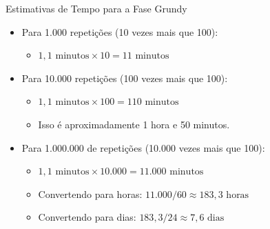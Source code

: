 \begin{frame}{Estimativas de Tempo para a Fase Grundy}
    \begin{itemize}
        \item Para 1.000 repetições (10 vezes mais que 100):
        \begin{itemize}
            \item $1,1 \text{ minutos} \times 10 = 11 \text{ minutos}$
        \end{itemize}
        
        \vspace{0.4cm}
        
        \item Para 10.000 repetições (100 vezes mais que 100):
        \begin{itemize}
            \item $1,1 \text{ minutos} \times 100 = 110 \text{ minutos}$
            \item Isso é aproximadamente 1 hora e 50 minutos.
        \end{itemize}
        
        \vspace{0.4cm}
        
        \item Para 1.000.000 de repetições (10.000 vezes mais que 100):
        \begin{itemize}
            \item $1,1 \text{ minutos} \times 10.000 = 11.000 \text{ minutos}$
            \item Convertendo para horas: $11.000 / 60 \approx 183,3 \text{ horas}$
            \item Convertendo para dias: $183,3 / 24 \approx 7,6 \text{ dias}$
        \end{itemize}
    \end{itemize}
\end{frame}